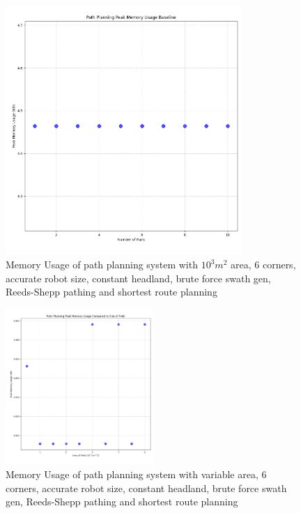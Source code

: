 \documentclass[final]{cmpreport_02}
\begin{document}
\begin{figure}[h!]
	\centering
	\includegraphics[width=0.8\textwidth]{./images/pathingBaseLineMem.png}
	\caption{Memory Usage of path planning system with $10^3m^2$ area, 6 corners, accurate robot size, constant headland, brute force swath gen, Reeds-Shepp pathing and shortest route planning}
	\label{PE:p:BaselineMem}
\end{figure}


\begin{figure}[h!]
	\centering
	\includegraphics[width=0.5\textwidth]{./images/pathingSizeMem.png}
	\caption{Memory Usage of path planning system with variable area, 6 corners, accurate robot size, constant headland, brute force swath gen, Reeds-Shepp pathing and shortest route planning}
	\label{PE:p:SizeMem}
\end{figure}
\end{document}
